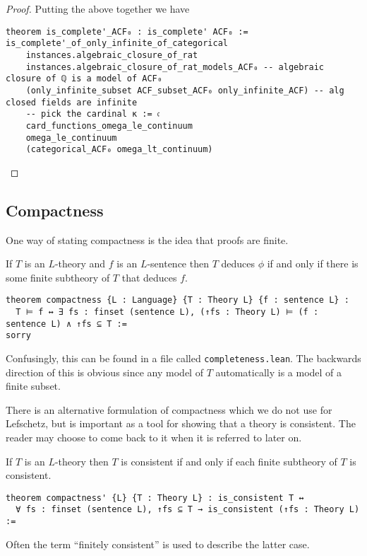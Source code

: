 \begin{proof}
Putting the above together we have
\begin{lstlisting}
theorem is_complete'_ACF₀ : is_complete' ACF₀ :=
is_complete'_of_only_infinite_of_categorical
    instances.algebraic_closure_of_rat
    instances.algebraic_closure_of_rat_models_ACF₀ -- algebraic closure of ℚ is a model of ACF₀
    (only_infinite_subset ACF_subset_ACF₀ only_infinite_ACF) -- alg closed fields are infinite
    -- pick the cardinal κ := 𝔠
    card_functions_omega_le_continuum
    omega_le_continuum
    (categorical_ACF₀ omega_lt_continuum) \end{lstlisting}
\end{proof}

\subsection{Compactness}

One way of stating compactness is the idea that proofs are finite.

\begin{prop}
If $T$ is an $L$-theory and $f$ is an $L$-sentence
then $T$ deduces $\phi$ if and only if there is some finite subtheory of $T$
that deduces $f$.

\begin{lstlisting}
theorem compactness {L : Language} {T : Theory L} {f : sentence L} :
  T ⊨ f ↔ ∃ fs : finset (sentence L), (↑fs : Theory L) ⊨ (f : sentence L) ∧ ↑fs ⊆ T :=
sorry
\end{lstlisting}
\end{prop}

Confusingly, this can be found in a file called \texttt{completeness.lean}.
The backwards direction of this is obvious since any model of $T$ automatically
is a model of a finite subset.

There is an alternative formulation of compactness which we do not use for Lefschetz,
but is important as a tool for showing that a theory is consistent.
The reader may choose to come back to it when it is referred to later on.

\begin{prop}
  If $T$ is an $L$-theory then $T$ is consistent if and only if
  each finite subtheory of $T$ is consistent.

  \begin{lstlisting}
theorem compactness' {L} {T : Theory L} : is_consistent T ↔
  ∀ fs : finset (sentence L), ↑fs ⊆ T → is_consistent (↑fs : Theory L) := \end{lstlisting}

  Often the term ``finitely consistent'' is used to describe the latter case.
\end{prop}

